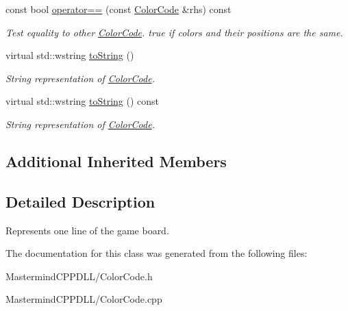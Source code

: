 \begin{DoxyCompactItemize}
\hypertarget{classmastermind_1_1logic_1_1_color_code_a1df362494f61e175b6abd342961a4c87}{}\label{classmastermind_1_1logic_1_1_color_code_a1df362494f61e175b6abd342961a4c87} 
const bool \hyperlink{classmastermind_1_1logic_1_1_color_code_a1df362494f61e175b6abd342961a4c87}{operator==} (const \hyperlink{classmastermind_1_1logic_1_1_color_code}{Color\+Code} \&rhs) const
\begin{DoxyCompactList}\small\item\em Test equality to other \hyperlink{classmastermind_1_1logic_1_1_color_code}{Color\+Code}. true if colors and their positions are the same. \end{DoxyCompactList}\item 
\hypertarget{classmastermind_1_1logic_1_1_color_code_acba1d8df3a2a5b4907009c7d21cbd723}{}\label{classmastermind_1_1logic_1_1_color_code_acba1d8df3a2a5b4907009c7d21cbd723} 
virtual std\+::wstring \hyperlink{classmastermind_1_1logic_1_1_color_code_acba1d8df3a2a5b4907009c7d21cbd723}{to\+String} ()
\begin{DoxyCompactList}\small\item\em String representation of \hyperlink{classmastermind_1_1logic_1_1_color_code}{Color\+Code}. \end{DoxyCompactList}\item 
\hypertarget{classmastermind_1_1logic_1_1_color_code_a5d3903d505ecbd831d7e3776a0076c51}{}\label{classmastermind_1_1logic_1_1_color_code_a5d3903d505ecbd831d7e3776a0076c51} 
virtual std\+::wstring \hyperlink{classmastermind_1_1logic_1_1_color_code_a5d3903d505ecbd831d7e3776a0076c51}{to\+String} () const
\begin{DoxyCompactList}\small\item\em String representation of \hyperlink{classmastermind_1_1logic_1_1_color_code}{Color\+Code}. \end{DoxyCompactList}\end{DoxyCompactItemize}
\subsection*{Additional Inherited Members}


\subsection{Detailed Description}
Represents one line of the game board. 

The documentation for this class was generated from the following files\+:\begin{DoxyCompactItemize}
\item 
Mastermind\+C\+P\+P\+D\+L\+L/Color\+Code.\+h\item 
Mastermind\+C\+P\+P\+D\+L\+L/Color\+Code.\+cpp\end{DoxyCompactItemize}
